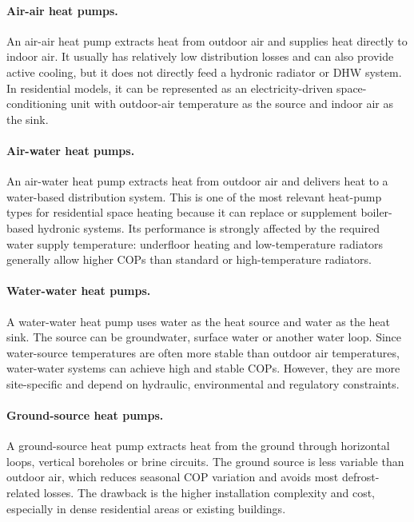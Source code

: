 \paragraph{Air-air heat pumps.}
An air-air heat pump extracts heat from outdoor air and supplies heat directly to indoor air. It usually has relatively low distribution losses and can also provide active cooling, but it does not directly feed a hydronic radiator or DHW system. In residential models, it can be represented as an electricity-driven space-conditioning unit with outdoor-air temperature as the source and indoor air as the sink.

\paragraph{Air-water heat pumps.}
An air-water heat pump extracts heat from outdoor air and delivers heat to a water-based distribution system. This is one of the most relevant heat-pump types for residential space heating because it can replace or supplement boiler-based hydronic systems. Its performance is strongly affected by the required water supply temperature: underfloor heating and low-temperature radiators generally allow higher COPs than standard or high-temperature radiators.

\paragraph{Water-water heat pumps.}
A water-water heat pump uses water as the heat source and water as the heat sink. The source can be groundwater, surface water or another water loop. Since water-source temperatures are often more stable than outdoor air temperatures, water-water systems can achieve high and stable COPs. However, they are more site-specific and depend on hydraulic, environmental and regulatory constraints.

\paragraph{Ground-source heat pumps.}
A ground-source heat pump extracts heat from the ground through horizontal loops, vertical boreholes or brine circuits. The ground source is less variable than outdoor air, which reduces seasonal COP variation and avoids most defrost-related losses. The drawback is the higher installation complexity and cost, especially in dense residential areas or existing buildings.

